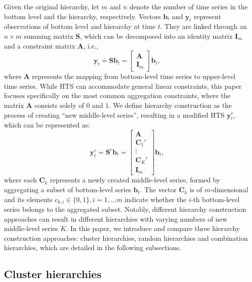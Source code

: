 \documentclass[a4paper,review,12pt,authoryear]{elsarticle}
\begin{document}
Given the original hierarchy, let $m$ and $n$ denote the number of time series in the bottom level and the hierarchy, respectively. Vectors $\boldsymbol{b}_t$ and $\boldsymbol{y}_t$ represent observations of bottom level and hierarchy at time $t$. They are linked through an $n\times m$ summing matrix $\boldsymbol{S}$, which can be decomposed into an identity matrix $\boldsymbol{I}_m$ and a constraint matrix $\boldsymbol{A}$, i.e., 
\[
  \boldsymbol{y}_t = \boldsymbol{S}\boldsymbol{b}_t = \begin{bmatrix}
    \boldsymbol{A} \\ \boldsymbol{I}_m 
  \end{bmatrix}  \boldsymbol{b}_t,
\]
where $\boldsymbol{A}$ represents the mapping from bottom-level time series to upper-level time series. While HTS can accommodate general linear constraints, this paper focuses specifically on the most common aggregation constraints, where the matrix $\boldsymbol{A}$ consists solely of $0$ and $1$.
We define hierarchy construction as the process of creating ``new middle-level series'', resulting in a modified HTS $\boldsymbol{y}^c_t$, which can be represented as:
\[
    \boldsymbol{y}^c_t = \boldsymbol{S}^c\boldsymbol{b}_t = \begin{bmatrix}
        \boldsymbol{A} \\
        \boldsymbol{C}_1' \\
        \vdots \\
        \boldsymbol{C}_K' \\
        \boldsymbol{I}_m
    \end{bmatrix}\boldsymbol{b}_t,
\] 
where each $\boldsymbol{C}_k$ represents a newly created middle-level series, formed by aggregating a subset of bottom-level series $\boldsymbol{b}_t$. The vector $\boldsymbol{C}_k$ is of $m$-dimensional and its elements $c_{k, i} \in \{0, 1\}, i=1,\dots m$ indicate whether the $i$-th bottom-level series belongs to the aggregated subset. Notably, different hierarchy construction approaches can result in different hierarchies with varying numbers of new middle-level series $K$. In this paper, we introduce and compare three hierarchy construction approaches: cluster hierarchies, random hierarchies and combination hierarchies, which are detailed in the following subsections.


\subsection{Cluster hierarchies}
\label{sec:cluster}
\end{document}
